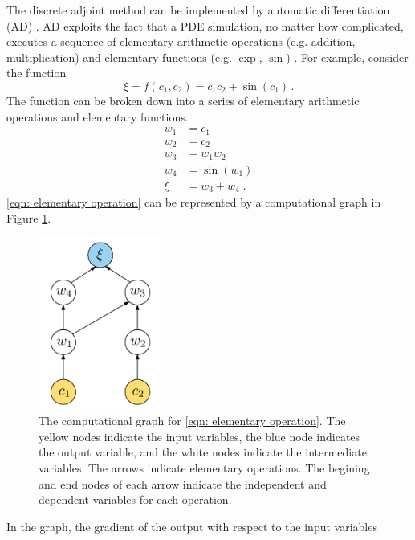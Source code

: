 The discrete adjoint method can be implemented by automatic differentiation (AD) 
\cite{AD review}.
AD exploits the fact that a PDE simulation, no matter how complicated, executes a sequence
of elementary arithmetic operations (e.g. addition, multiplication) and elementary functions
(e.g. $\exp$, $\sin$) \cite{AD review}. For example, consider the function
\begin{equation}
    \xi = f(c_1, c_2) = c_1 c_2 + \sin(c_1)\,.
    \label{eqn: eg y=fx}
\end{equation}
The function can be broken down into a series of elementary arithmetic operations and
elementary functions.
\begin{equation}\begin{split}
    w_1 &= c_1\\
    w_2 &= c_2\\
    w_3 &= w_1 w_2\\
    w_4 &= \sin(w_1)\\
    \xi &= w_3 + w_4\;.
    \end{split}
    \label{eqn: elementary operation}
\end{equation}
\eqref{eqn: elementary operation} can be represented by a computational 
graph in Figure \ref{fig: AD graph}.
\begin{figure}
    \begin{center}
    \includegraphics[width=4cm]{../AD_tree.png}
    \caption{The computational graph for \eqref{eqn: elementary operation}. The yellow nodes indicate
             the input variables, the blue node indicates the output variable, and the white
             nodes indicate the intermediate variables. The arrows indicate elementary operations.
             The begining and end nodes of each 
             arrow indicate the independent and dependent variables for each operation.}
    \label{fig: AD graph}
    \end{center}
\end{figure}
In the graph,
the gradient of the output with respect to the input variables 
